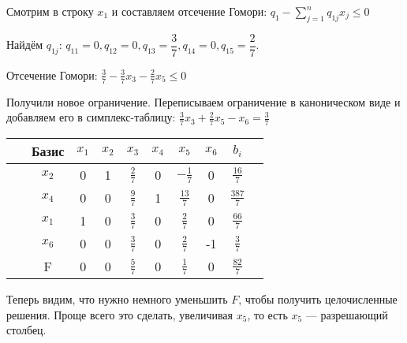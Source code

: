 Смотрим в строку $x_1$ и составляем отсечение Гомори: $q_1 - \sum\limits_{j=1}^n q_{1j}x_j \leq 0$

Найдём $q_{1j}$: $q_{11} = 0, q_{12} = 0, q_{13} = \dfrac{3}{7}, q_{14} = 0, q_{15} = \dfrac{ 2}{ 7}$.

Отсечение Гомори: $ \frac{ 3}{ 7} - \frac{ 3}{ 7}x_3 - \frac{ 2}{ 7}x_5 \leq 0 $

Получили новое ограничение. Переписываем ограничение в каноническом виде и добавляем его в симплекс-таблицу: $ \frac{ 3}{ 7}x_3 + \frac{ 2}{ 7}x_5 - x_6 = \frac{ 3}{ 7} $

\begin{table}[H]
    \centering
    \begin{tabular}{|c|c|c|c|c|c|c|c|c|c|}
        \hline
          & Базис & $x_1$ & $x_2$ & $x_3$            & $x_4$ & $x_5$              & $x_6$ & $b_i$                \\ \hline
        ~ & $x_2$ & 0     & 1     & $ \frac{ 2}{ 7}$ & 0     & $- \frac{ 1}{ 7}$  & 0     & $ \frac{ 16}{ 7}$    \\ \hline
          & $x_4$ & 0     & 0     & $ \frac{ 9}{ 7}$ & 1     & $ \frac{ 13}{ 7} $ & 0     & $  \frac{387 }{ 7} $ \\ \hline
          & $x_1$ & 1     & 0     & $ \frac{ 3}{ 7}$ & 0     & $ \frac{2}{7} $    & 0     & $\frac{66}{7}$       \\ \hline
        ~ & $x_6$ & 0     & 0     & $\frac{ 3}{ 7}$  & 0     & $ \frac{ 2}{ 7} $  & -1    & $\frac{3}{7}$        \\ \hline
          & F     & 0     & 0     & $ \frac{ 5}{ 7}$ & 0     & $ \frac{ 1}{ 7}$   & 0     & $ \frac{82}{7} $     \\ \hline
    \end{tabular}
\end{table}

Теперь видим, что нужно немного уменьшить $F$, чтобы получить целочисленные решения. Проще всего это сделать, увеличивая $x_5$, то есть $x_5$ --- разрешающий столбец.


